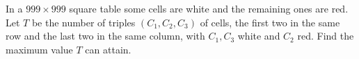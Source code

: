 In a 
$999 \times 999$
 square table some cells are white and the remaining ones are red. Let 
$T$
 be the number of triples 
$(C_1,C_2,C_3)$
 of cells, the first two in the same row and the last two in the same column, with 
$C_1,C_3$
 white and 
$C_2$
 red. Find the maximum value 
$T$
 can attain.
